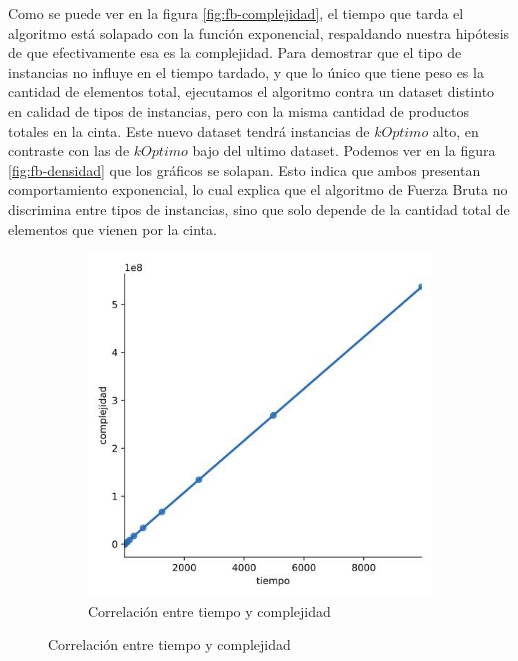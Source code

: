 \documentclass[10pt,a4paper]{article}
\begin{document}
Como se puede ver en la figura \ref{fig:fb-complejidad}, el tiempo que tarda el algoritmo está solapado con la función exponencial, respaldando nuestra hipótesis de que efectivamente esa es la complejidad.
\newline
Para demostrar que el tipo de instancias no influye en el tiempo tardado, y que lo único que tiene peso es la cantidad de elementos total, ejecutamos el algoritmo contra un dataset distinto en calidad de tipos de instancias, pero con la misma cantidad de productos totales en la cinta. Este nuevo dataset tendrá instancias de $kOptimo$ alto, en contraste con las de $kOptimo$ bajo del ultimo dataset.
\newline
\newline
Podemos ver en la figura \ref{fig:fb-densidad} que los gráficos se solapan. Esto indica que ambos presentan comportamiento exponencial, lo cual explica que el algoritmo de Fuerza Bruta no discrimina entre tipos de instancias, sino que solo depende de la cantidad total de elementos que vienen por la cinta.
\newline
\begin{figure}[h!]
	\centering
	\begin{subfigure}{0.4\linewidth}
		\centering
			\includegraphics[scale=0.3]{img/fb-correlacion.jpg}
			\caption{Correlación entre tiempo y complejidad}
			\label{fig:fb-correlacion}
	\end{subfigure}	
\end{figure}
\end{document}
